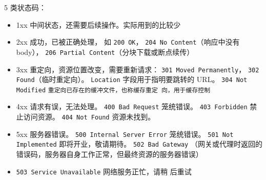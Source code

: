 5 类状态码：
\begin{itemize}
\item 1xx 中间状态，还需要后续操作。实际用到的比较少
\item 2xx 成功，已被正确处理， 如 \verb`200 OK`， \verb`204 No Content`（响应中没有 body）， \verb`206 Partial Content`（分块下载或断点续传）
\item 3xx 重定向，资源位置改变，需要重新请求： \verb`301 Moved Permanently`， \verb`302 Found`（临时重定向）。 \verb`Location` 字段用于指明要跳转的 URL。 \verb`304 Not Modified` \verb`重定向已存在的缓冲文件，也称缓存重定 向，用于缓存控制`
\item 4xx 请求有误，无法处理。 \verb`400 Bad Request` 笼统错误。 \verb`403 Forbidden` 禁止访问资源。 \verb`404 Not Found` 资源未找到。
\item 5xx 服务器错误。 \verb`500 Internal Server Error` 笼统错误。 \verb`501 Not Implemented` 即将开业，敬请期待。 \verb`502 Bad Gateway` （网关或代理时返回的错误码，服务器自身工作正常，但最终资源的服务器错误）
\item \verb`503 Service Unavailable` 网络服务正忙，请稍 后重试
\end{itemize}

